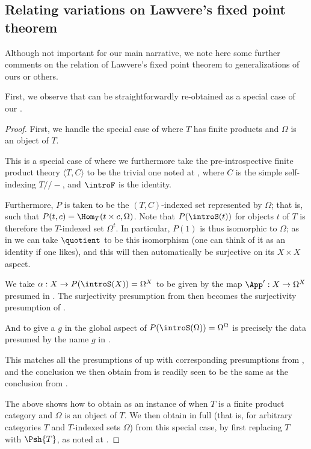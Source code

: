 
\subsection{Relating variations on Lawvere's fixed point theorem}
Although not important for our main narrative, we note here some further comments on the relation of Lawvere's fixed point theorem to generalizations of ours or others.

First, we observe that  can be straightforwardly re-obtained as a special case of our .
\begin{proof}
First, we handle the special case of  where $T$ has finite products and $\Omega$ is an object of $T$.

This is a special case of  where we furthermore take the pre-introspective finite product theory $\langle T, C \rangle$ to be the trivial one noted at , where $C$ is the simple self-indexing $T//-$, and $\introF$ is the identity.

Furthermore, $P$ is taken to be the $(T, C)$-indexed set represented by $\Omega$; that is, such that $P(t, c) = \Hom_T(t \times c, \Omega)$. Note that $P(\introS(t))$ for objects $t$ of $T$ is therefore the $T$-indexed set $\Omega^t$. In particular, $P(1)$ is thus isomorphic to $\Omega$; as in  we can take $\quotient$ to be this isomorphism (one can think of it as an identity if one likes), and this will then automatically be surjective on its $X \times X$ aspect.

We take $\alpha : X \to P(\introS(X)) = \Omega^X$ to be given by the map $\App' : X \to \Omega^X$ presumed in . The surjectivity presumption from  then becomes the surjectivity presumption of . 

And to give a $g$ in the global aspect of $P(\introS(\Omega)) = \Omega^\Omega$ is precisely the data presumed by the name $g$ in .

This matches all the presumptions of  up with corresponding presumptions from , and the conclusion we then obtain from  is readily seen to be the same as the conclusion from .

The above shows how to obtain  as an instance of  when $T$ is a finite product category and $\Omega$ is an object of $T$. We then obtain  in full (that is, for arbitrary categories $T$ and $T$-indexed sets $\Omega$) from this special case, by first replacing $T$ with $\Psh{T}$, as noted at .
\end{proof}

